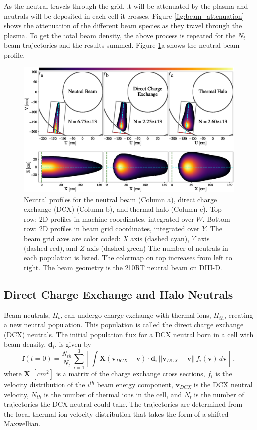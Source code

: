As the neutral travels through the grid, it will be attenuated by the plasma and neutrals will be deposited in each cell it crosses. Figure \ref{fig:beam_attenuation} shows the attenuation of the different beam species as they travel through the plasma. To get the total beam density, the above process is repeated for the $N_t$ beam trajectories and the results summed. Figure \ref{fig:beam_density}a shows the neutral beam profile.
\begin{figure}[h!]
    \centering
    \includegraphics[width=16cm]{figures/beam_density.eps}
    \caption{Neutral profiles for the neutral beam (Column a), direct charge exchange (DCX) (Column b), and thermal halo (Column c). Top row: 2D profiles in machine coordinates, integrated over $W$. Bottom row: 2D profiles in beam grid coordinates, integrated over $Y$. The beam grid axes are color coded: $X$ axis (dashed cyan), $Y$ axis (dashed red), and $Z$ axis (dashed green) The number of neutrals in each population is listed. The colormap on top increases from left to right. The beam geometry is the 210RT neutral beam on DIII-D.}
    \label{fig:beam_density}
\end{figure}

\subsection{Direct Charge Exchange and Halo Neutrals}
Beam neutrals, $H_b$, can undergo charge exchange with thermal ions, $H_{th}^+$, creating a new neutral population. This population is called the direct charge exchange (DCX) neutrals. The initial population flux for a DCX neutral born in a cell with beam density, $\mathbf{d}_i$, is given by
\begin{equation} \label{eq:dcx_rates}
    \mathbf{f}(t=0) = \frac{N_{th}}{N_{t}}\sum_{i=1}^3 \left [ \int \mathbf{X}(\mathbf{v}_{DCX} - \mathbf{v}) \cdot \mathbf{d}_i\, ||\mathbf{v}_{DCX} - \mathbf{v}||\, f_i(\mathbf{v})\, d\mathbf{v} \right ]\,,
\end{equation}
where $\mathbf{X}$ $[cm^2]$ is a matrix of the charge exchange cross sections, $f_i$ is the velocity distribution of the $i^{th}$ beam energy component, $\mathbf{v}_{DCX}$ is the DCX neutral velocity, $N_{th}$ is the number of thermal ions in the cell, and $N_{t}$ is the number of trajectories the DCX neutral could take. The trajectories are determined from the local thermal ion velocity distribution that takes the form of a shifted Maxwellian.

